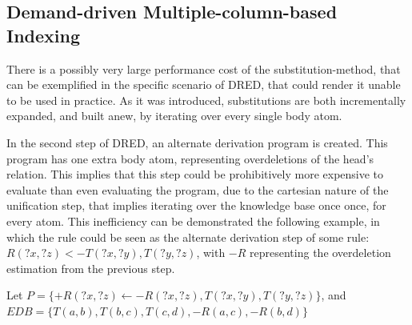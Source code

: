 \documentclass[sigconf,screen,review,natbib]{acmart}
\theoremstyle{definition}
\begin{document}
\subsection{Demand-driven Multiple-column-based Indexing}
There is a possibly very large performance cost of the substitution-method, that can be exemplified in the specific scenario
of DRED, that could render it unable to be used in practice. As it was introduced, substitutions are both incrementally expanded,
and built anew, by iterating over every single body atom.

In the second step of DRED, an alternate derivation program is created. This program has one extra body atom, representing
overdeletions of the head's relation. This implies that this step could be prohibitively more expensive to evaluate than even
evaluating the program, due to the cartesian nature of the unification step, that implies iterating over the knowledge base once
once, for every atom. This inefficiency can be demonstrated the following example, in which the rule could be seen as the
alternate derivation step of some rule: $R(?x, ?z) <- T(?x, ?y), T(?y, ?z)$, with $-R$ representing the overdeletion estimation
from the previous step.

Let $P = \{+R(?x, ?z) \leftarrow -R(?x, ?z), T(?x, ?y), T(?y, ?z)\}$, and $EDB = \{T(a, b), T(b, c), T(c, d), -R(a, c), -R(b, d)\}$
\end{document}
